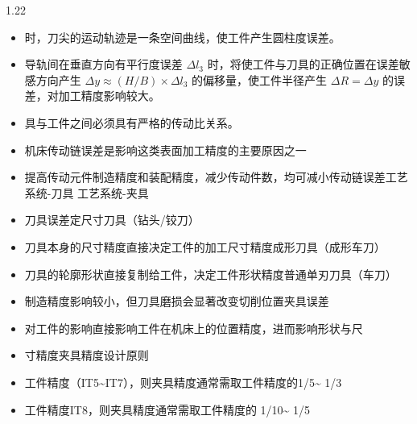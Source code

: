 \documentclass[12pt,a4paper]{article}
\begin{document}
\begin{spacing}{1.22}
\begin{itemize}[leftmargin=2.2em,label=--]
  \item 时，刀尖的运动轨迹是一条空间曲线，使工件产生圆柱度误差。
  \item 导轨间在垂直方向有平行度误差 $\Delta l_3$ 时，将使工件与刀具的正确位置在误差敏感方向产生 $\Delta y\approx(H/B)\times\Delta l_3$ 的偏移量，使工件半径产生 $\Delta R=\Delta y$ 的误差，对加工精度影响较大。
  \item 具与工件之间必须具有严格的传动比关系。
  \item 机床传动链误差是影响这类表面加工精度的主要原因之一
  \item 提高传动元件制造精度和装配精度，减少传动件数，均可减小传动链误差工艺系统-刀具 工艺系统-夹具
  \item 刀具误差定尺寸刀具（钻头/铰刀）
  \item 刀具本身的尺寸精度直接决定工件的加工尺寸精度成形刀具（成形车刀）
  \item 刀具的轮廓形状直接复制给工件，决定工件形状精度普通单刃刀具（车刀）
  \item 制造精度影响较小，但刀具磨损会显著改变切削位置夹具误差
  \item 对工件的影响直接影响工件在机床上的位置精度，进而影响形状与尺
  \item 寸精度夹具精度设计原则
  \item 工件精度（IT5\textasciitilde{}IT7），则夹具精度通常需取工件精度的1/5\textasciitilde{} 1/3
  \item 工件精度IT8，则夹具精度通常需取工件精度的 1/10\textasciitilde{} 1/5
\end{itemize}


\end{spacing}
\end{document}
